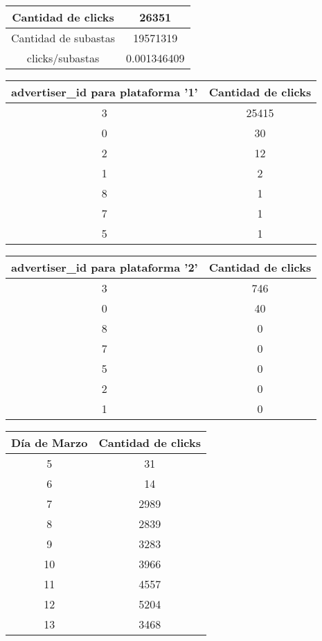 \begin{center}
	\begin{tabular}{ |c|c| }
	\hline
	Cantidad de clicks & 26351 \\
	\hline
	Cantidad de subastas & 19571319 \\
	\hline
	clicks/subastas & 0.001346409 \\
	\hline
	\end{tabular}
	
	\begin{tabular}{ |c|c| }
	\hline
	advertiser\_id para plataforma '1' & Cantidad de clicks \\
	\hline\hline
	3	&	25415 \\
	\hline
	0   &   30 \\
	\hline
	2   &   12 \\
	\hline
	1	&   2 \\
	\hline
	8	&	1 \\
	\hline
	7	&	1 \\
	\hline
	5	&	1 \\
	\hline
	\end{tabular}

	\begin{tabular}{ |c|c| }
	\hline
	advertiser\_id para plataforma '2' & Cantidad de clicks \\
	\hline\hline	
	3	&	746 \\
	\hline
	0	&	40 \\
	\hline
	8	&	0 \\
	\hline
	7	&	0 \\
	\hline
	5	&	0 \\
	\hline
	2	&	0 \\
	\hline
	1	&	0 \\
	\hline
	\end{tabular}
	
	\begin{tabular}{ |c|c| }
    	\hline
        Día de Marzo & Cantidad de clicks \\
        \hline\hline
		5 & 31\\
        \hline
       	6 & 14 \\
        \hline
        7 & 2989 \\
        \hline
        8 & 2839 \\
        \hline
        9 & 3283\\
        \hline
       	10 & 3966 \\
        \hline
        11 & 4557 \\
        \hline
        12 & 5204 \\
        \hline
        13 & 3468\\
        \hline
	\end{tabular}
\end{center}

